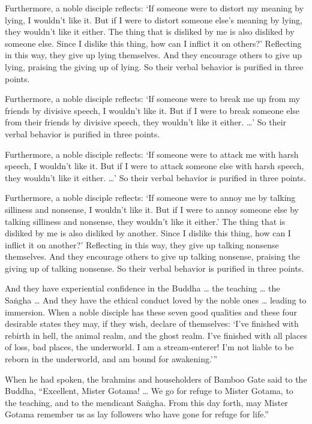 \documentclass[12pt,openany]{book}%
\begin{document}
Furthermore, a noble disciple reflects: ‘If someone were to distort my meaning by lying, I wouldn’t like it. But if I were to distort someone else’s meaning by lying, they wouldn’t like it either. The thing that is disliked by me is also disliked by someone else. Since I dislike this thing, how can I inflict it on others?’ Reflecting in this way, they give up lying themselves. And they encourage others to give up lying, praising the giving up of lying. So their verbal behavior is purified in three points. 

Furthermore, a noble disciple reflects: ‘If someone were to break me up from my friends by divisive speech, I wouldn’t like it. But if I were to break someone else from their friends by divisive speech, they wouldn’t like it either. …’ So their verbal behavior is purified in three points. 

Furthermore, a noble disciple reflects: ‘If someone were to attack me with harsh speech, I wouldn’t like it. But if I were to attack someone else with harsh speech, they wouldn’t like it either. …’ So their verbal behavior is purified in three points. 

Furthermore, a noble disciple reflects: ‘If someone were to annoy me by talking silliness and nonsense, I wouldn’t like it. But if I were to annoy someone else by talking silliness and nonsense, they wouldn’t like it either.’ The thing that is disliked by me is also disliked by another. Since I dislike this thing, how can I inflict it on another?’ Reflecting in this way, they give up talking nonsense themselves. And they encourage others to give up talking nonsense, praising the giving up of talking nonsense. So their verbal behavior is purified in three points. 

And they have experiential confidence in the Buddha … the teaching … the \textsanskrit{Saṅgha} … And they have the ethical conduct loved by the noble ones … leading to immersion. When a noble disciple has these seven good qualities and these four desirable states they may, if they wish, declare of themselves: ‘I’ve finished with rebirth in hell, the animal realm, and the ghost realm. I’ve finished with all places of loss, bad places, the underworld. I am a stream-enterer! I’m not liable to be reborn in the underworld, and am bound for awakening.’” 

When he had spoken, the brahmins and householders of Bamboo Gate said to the Buddha, “Excellent, Mister Gotama! … We go for refuge to Mister Gotama, to the teaching, and to the mendicant \textsanskrit{Saṅgha}. From this day forth, may Mister Gotama remember us as lay followers who have gone for refuge for life.” 
\end{document}
